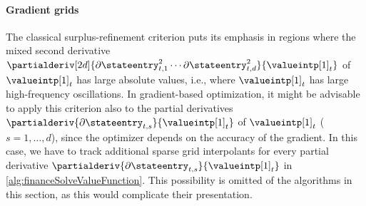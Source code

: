 \begin{algorithm}
  \begin{algorithmic}[1]
      \EndFor{}
    \EndFunction{}
  \end{algorithmic}
  \caption[Refinement of the value function (\texttt{refine})]{%
    In-place refinement of the value function $\valueintp[1]_t$.
    Inputs are
    the time $t$,
    the piecewise linear interpolant $\valueintp[1]_t$
    of the current iteration $t$, and
    the higher-order B-spline interpolant $\valueintp[p]_{t+1}$
    of the previous iteration $t + 1$
    (not used if $t = T$).
    The output is the updated piecewise linear interpolant $\valueintp[1]_t$
    with refined sparse grid.%
  }%
  \label{alg:financeRefine}%
\end{algorithm}

\paragraph{Gradient grids}

The classical surplus-refinement criterion puts its emphasis
in regions where the mixed second derivative
$\partialderiv[2d]{
  \partialdiff \stateentry_{t,1}^2 \dotsm \partialdiff \stateentry_{t,d}^2
}{
  \valueintp[1]_t
}$
of $\valueintp[1]_t$ has large absolute values, i.e.,
where $\valueintp[1]_t$ has large high-frequency oscillations.
In gradient-based optimization,
it might be advisable to apply this criterion also
to the partial derivatives
$\partialderiv{\partialdiff \stateentry_{t,s}}{\valueintp[1]_t}$
of $\valueintp[1]_t$ ($s = 1, \dotsc, d$),
since the optimizer depends on the accuracy of the gradient.
In this case, we have to track additional sparse grid interpolants
for every partial derivative
$\partialderiv{\partialdiff \stateentry_{t,s}}{\valueintp[1]_t}$
in \cref{alg:financeSolveValueFunction}.
This possibility is omitted of the algorithms in this section,
as this would complicate their presentation.



